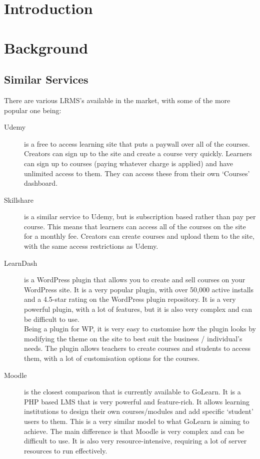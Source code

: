 \documentclass[11pt, a4paper,twoside]{report}
\theoremstyle{plain} %
\theoremstyle{definition} %
\numberwithin{equation}{chapter}
\begin{document}
\chapter{Introduction}\label{ch:introduction}



\chapter{Background}\label{ch:background}

\section{Similar Services}\label{sec:similarservices}

There are various LRMS's available in the market, with some of the more popular
one being:

\begin{description}
    \item[Udemy] {
        is a free to access learning site that puts a paywall over all of
        the courses. Creators can sign up to the site and create a course very
        quickly. Learners can sign up to courses (paying whatever charge is
        applied) and have unlimited access to them. They can access these from
        their own `Courses' dashboard.
        }
    \item[Skillshare] {
        is a similar service to Udemy, but is subscription based rather than
        pay per course. This means that learners can access all of the courses
        on the site for a monthly fee. Creators can create courses and upload
        them to the site, with the same access restrictions as Udemy.
        }
    \item[LearnDash\cite{learndash}] {
        is a WordPress plugin that allows you to create and sell
        courses on your WordPress site. It is a very popular plugin, with
        over 50,000 active installs and a 4.5-star rating on the WordPress
        plugin repository. It is a very powerful plugin, with a lot of
        features, but it is also very complex and can be difficult to use.\\
        Being a plugin for WP, it is very easy to customise how the plugin
        looks by modifying the theme on the site to best suit the business /
        individual's needs. The plugin allows teachers to create courses and
        students to access them, with a lot of customisation options for the
        courses.
        }
    \item[Moodle\cite{moodle}] {
        is the closest comparison that is currently available to GoLearn. It
        is a PHP based LMS that is very powerful and feature-rich. It allows
        learning institutions to design their own courses/modules and add
        specific `student' users to them. This is a very similar model to
        what GoLearn is aiming to achieve. The main difference is that Moodle
        is very complex and can be difficult to use. It is also very
        resource-intensive, requiring a lot of server resources to run
        effectively.
        }
\end{description}
\end{document}
